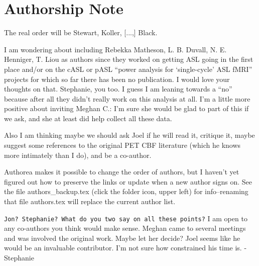 \section*{Authorship Note}
The real order will be Stewart, Koller, [...,] Black.

I am wondering about including Rebekka Matheson, L. B. Duvall, N. E. Henniger, T. Liou as authors since they worked on getting ASL going in the first place and/or on the cASL or pASL ``power analysis for `single-cycle' ASL fMRI'' projects for which so far there has been no publication. I would love your thoughts on that. Stephanie, you too. I guess I am leaning towards a ``no'' because after all they didn't really work on this analysis at all. I'm a little more positive about inviting Meghan C.: I'm sure she would be glad to part of this if we ask, and she at least did help collect all these data. 

Also I am thinking maybe we should ask Joel if he will read it, critique it, maybe suggest some references to the original PET CBF literature (which he knows more intimately than I do), and be a co-author. 

Authorea makes it possible to change the order of authors, but I haven't yet figured out how to preserve the links or update when a new author signs on. See the file authors\_backup.tex (click the folder icon, upper left) for info--renaming that file authors.tex will replace the current author list.

\verb|Jon? Stephanie? What do you two say on all these points?|
I am open to any co-authors you think would make sense. Meghan came to several meetings and was involved the original work. Maybe let her decide? Joel seems like he would be an invaluable contributor. I'm not sure how constrained his time is.
-Stephanie